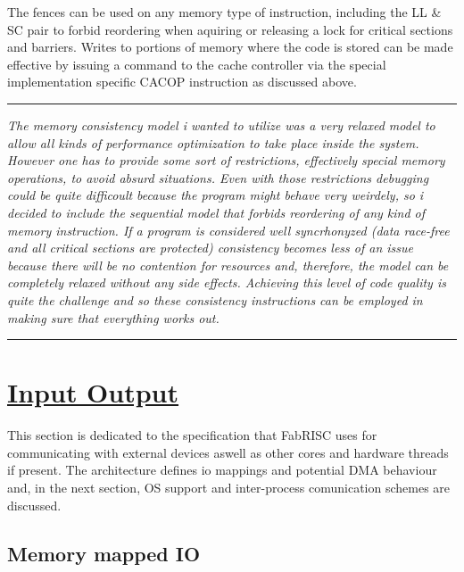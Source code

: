 \documentclass{article}
\begin{document}
            The fences can be used on any memory type of instruction, including the LL & SC pair to forbid reordering when aquiring or releasing a lock for critical sections and barriers. Writes to portions of memory where the code is stored can be made effective by issuing a command to the cache controller via the special implementation specific CACOP instruction as discussed above.

        \par\noindent\rule{\textwidth}{0.4pt}
        \textit{The memory consistency model i wanted to utilize was a very relaxed model to allow all kinds of performance optimization to take place inside the system. However one has to provide some sort of restrictions, effectively special memory operations, to avoid absurd situations. Even with those restrictions debugging could be quite difficoult because the program might behave very weirdely, so i decided to include the sequential model that forbids reordering of any kind of memory instruction. If a program is considered well syncrhonyzed (data race-free and all critical sections are protected) consistency becomes less of an issue because there will be no contention for resources and, therefore, the model can be completely relaxed without any side effects. Achieving this level of code quality is quite the challenge and so these consistency instructions can be employed in making sure that everything works out.}
        \par\noindent\rule{\textwidth}{0.4pt}

    \clearpage


    \section[Input Output]{\LARGE\underline{Input Output}}

        This section is dedicated to the specification that FabRISC uses for communicating with external devices aswell as other cores and hardware threads if present. The architecture defines io mappings and potential DMA behaviour and, in the next section, OS support and inter-process comunication schemes are discussed.

        \subsection{Memory mapped IO}
\end{document}
